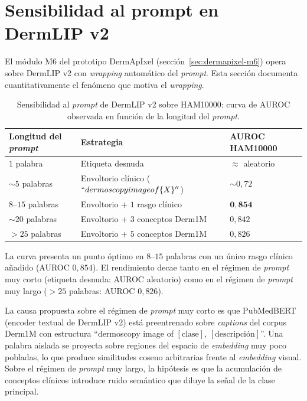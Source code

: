\section{Sensibilidad al prompt en DermLIP v2}
\label{sec:anexoh-prompt-derm}

El módulo M6 del prototipo DermApIxel
(secci\'on~\ref{sec:dermapixel-m6}) opera sobre DermLIP v2 con
\emph{wrapping} automático del \emph{prompt}. Esta sección
documenta cuantitativamente el fenómeno que motiva el
\emph{wrapping}.

\begin{table}[H]
\centering
\footnotesize
\setlength{\tabcolsep}{4pt}
\renewcommand{\arraystretch}{0.95}
\caption{Sensibilidad al \emph{prompt} de DermLIP v2 sobre
HAM10000: curva de AUROC observada en función de la longitud
del \emph{prompt}.}
\label{tab:anexoh-prompt-curva}
\begin{tabular}{lll}
\hline
Longitud del \emph{prompt}              & Estrategia                                         & AUROC HAM10000 \\
\hline
$1$ palabra                             & Etiqueta desnuda                                    & $\approx$ aleatorio \\
$\sim 5$ palabras                       & Envoltorio clínico ($``dermoscopy image of \{X\}''$) & $\sim 0{,}72$ \\
$8$--$15$ palabras                      & Envoltorio + $1$ rasgo clínico                      & $\mathbf{0{,}854}$ \\
$\sim 20$ palabras                      & Envoltorio + $3$ conceptos Derm1M                   & $0{,}842$ \\
$> 25$ palabras                         & Envoltorio + $5$ conceptos Derm1M                   & $0{,}826$ \\
\hline
\end{tabular}
\end{table}

La curva presenta un punto óptimo en $8$--$15$ palabras con
un único rasgo clínico añadido (AUROC $0{,}854$). El
rendimiento decae tanto en el régimen de \emph{prompt} muy corto
(etiqueta desnuda: AUROC aleatorio) como en el régimen de
\emph{prompt} muy largo ($>25$ palabras: AUROC $0{,}826$).

La causa propuesta sobre el régimen de \emph{prompt} muy corto es
que PubMedBERT (encoder textual de DermLIP v2) está preentrenado
sobre \emph{captions} del corpus Derm1M con estructura
``dermoscopy image of $[\text{clase}]$, $[\text{descripción}]$''.
Una palabra aislada se proyecta sobre regiones del espacio de
\emph{embedding} muy poco pobladas, lo que produce similitudes
coseno arbitrarias frente al \emph{embedding} visual. Sobre el
régimen de \emph{prompt} muy largo, la hipótesis es que la
acumulación de conceptos clínicos introduce ruido semántico que
diluye la señal de la clase principal.

